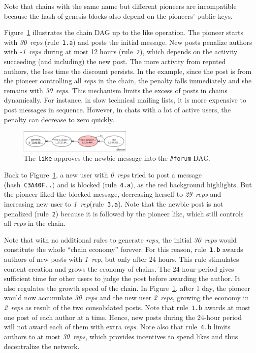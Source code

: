 \documentclass[12pt]{article}
\newcommand{\reps}     {\emph{reps}\xspace}
\newcommand{\onerep}   {\emph{1~rep}\xspace}
\newcommand{\nreps}[1] {\emph{#1~reps\xspace}}
\newcommand{\code}[1]  {\texttt{\footnotesize{#1}}}
\begin{document}
Note that chains with the same name but different pioneers are incompatible
because the hash of genesis blocks also depend on the pioneers' public keys.

Figure~\ref{fig.forum} illustrates the chain DAG up to the like operation.
The pioneer starts with \nreps{30} (rule~\code{1.a}) and posts the initial
message.
%
New posts penalize authors with \nreps{-1} during at most 12 hours
(rule~\code{2}), which depends on the activity succeeding (and including) the
new post.
The more activity from reputed authors, the less time the discount persists.
In the example, since the post is from the pioneer controlling all \reps in the
chain, the penalty falls immediately and she remains with \nreps{30}.
This mechanism limits the excess of posts in chains dynamically.
For instance, in slow technical mailing lists, it is more expensive to post
messages in sequence.
However, in chats with a lot of active users, the penalty can decrease to zero
quickly.

\begin{figure}
\centering
\includegraphics[width=0.49\textwidth]{forum.png}
\caption{
    The \code{like} approves the newbie message into the \code{\#forum} DAG.
}
\label{fig.forum}
\end{figure}

Back to Figure~\ref{fig.forum}, a new user with \nreps{0} tried to post a
message (hash~\code{C3A40F..}) and is blocked (rule~\code{4.a}), as the red
background highlights.
But the pioneer liked the blocked message, decreasing herself to \nreps{29}
and increasing new user to \onerep (rule~\code{3.a}).
Note that the newbie post is not penalized (rule~\code{2}) because it is
followed by the pioneer like, which still controls all \reps in the chain.

Note that with no additional rules to generate \reps, the initial \nreps{30}
would constitute the whole ``chain economy'' forever.
For this reason, rule~\code{1.b} awards authors of new posts with \onerep,
but only after 24 hours.
This rule stimulates content creation and grows the economy of chains.
The 24-hour period gives sufficient time for other users to judge the post
before awarding the author.
It also regulates the growth speed of the chain.
In Figure~\ref{fig.forum}, after 1 day, the pioneer would now accumulate
\nreps{30} and the new user \nreps{2}, growing the economy in \nreps{2} as
result of the two consolidated posts.
Note that rule~\code{1.b} awards at most one post of each author at a time.
Hence, new posts during the 24-hour period will not award each of them with
extra \reps.
Note also that rule~\code{4.b} limits authors to at most \nreps{30}, which
provides incentives to spend likes and thus decentralize the network.
\end{document}
